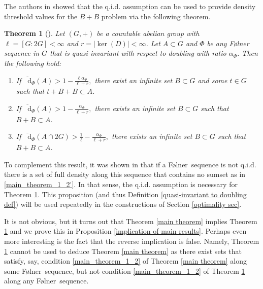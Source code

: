 \documentclass[reqno]{amsart}
\newcommand*\diff{\mathop{}\!\mathrm{d}}
\newtheorem{theorem}{Theorem}[section]
\theoremstyle{definition}
\theoremstyle{remark}
\theoremstyle{remark}
\newcommand{\Folner}{F\o{}lner}
\begin{document}
The authors in 
\cite{charamaras_kousek_mountakis_radic2025BBingroups} showed 
that the q.i.d. assumption can be used to provide density 
threshold values for the $B+B$ problem via the following
theorem. 

\begin{theorem}[{\cite[Theorem 1.3]{charamaras_kousek_mountakis_radic2025BBingroups}}]\label{CKMR}
Let $(G,+)$ be a countable abelian group with $\ell=[G:2G]<\infty$ and $r=|\ker(D)|<\infty$. 
Let $A\subset G$ and $\Phi$ be any \Folner{} sequence in $G$ that is quasi-invariant with respect to doubling with ratio $\alpha_{\Phi}$. Then the following hold:
\begin{enumerate}
\item  \label{main_theorem_1_2'}
If 
$\displaystyle \overline{\diff}_\Phi(A) > 1 - \frac{\ell\alpha_\Phi}{\ell +r},$
there exist an infinite set $B\subset G$ and some $t\in G$ such that 
$t+B+B\subset A$. 
\item  \label{main_theorem_1_1'} 
\vspace{2mm} 
If  
$\displaystyle { \overline{\diff}_\Phi(A) > 1 - \frac{\alpha_\Phi}{\ell+r}},$
there exists an infinite set $B\subset G$ such that $B+B\subset A$. 
\item   \label{main_theorem_evens'}  \vspace{2mm} If 
$\displaystyle\overline{\diff}_\Phi(A\cap 2G) > \frac{1}{\ell} - \frac{\alpha_\Phi}{\ell +r},$
there exists an infinite set $B\subset G$ such that $B+B\subset A$.
\end{enumerate}    
\end{theorem}

To complement this result, it was shown in 
\cite[Proposition 5.4]{charamaras_kousek_mountakis_radic2025BBingroups} 
that if 
a \Folner\ sequence is not q.i.d. there is a set of full 
density along this sequence that contains no sumset as in 
\eqref{main_theorem_1_2'}. In that sense, the q.i.d. 
assumption is necessary for Theorem \ref{CKMR}. This 
proposition (and thus Definition \ref{quasi-invariant to doubling def}) will be used repeatedly in the constructions of Section \ref{optimality sec}.

It is not obvious, but it turns out that Theorem \ref{main theorem} implies Theorem \ref{CKMR} and we prove this in Proposition \ref{implication of main results}. Perhaps even more interesting is the fact that the reverse implication is false. Namely, Theorem \ref{CKMR} cannot be used to deduce Theorem \ref{main theorem} as there exist sets that satisfy, say, condition \eqref{main_theorem_1_2} of Theorem \ref{main theorem} along some \Folner\ sequence, but not condition \eqref{main_theorem_1_2} of Theorem \ref{CKMR} along any \Folner\ sequence. 
\end{document}
